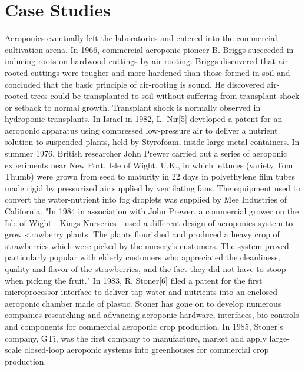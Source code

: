 \documentclass{article}
\begin{document}
\section{Case Studies}
Aeroponics eventually left the laboratories and entered into the commercial cultivation arena. In 1966, commercial aeroponic pioneer B. Briggs succeeded in inducing roots on hardwood cuttings by air-rooting. Briggs discovered that air-rooted cuttings were tougher and more hardened than those formed in soil and concluded that the basic principle of air-rooting is sound. He discovered air-rooted trees could be transplanted to soil without suffering from transplant shock or setback to normal growth. Transplant shock is normally observed in hydroponic transplants. 
In Israel in 1982, L. Nir[5] developed a patent for an aeroponic apparatus using compressed low-pressure air to deliver a nutrient solution to suspended plants, held by Styrofoam, inside large metal containers. 
In summer 1976, British researcher John Prewer carried out a series of aeroponic experiments near New Port, Isle of Wight, U.K., in which lettuces (variety Tom Thumb) were grown from seed to maturity in 22 days in polyethylene film tubes made rigid by pressurized air supplied by ventilating fans. The equipment used to convert the water-nutrient into fog droplets was supplied by Mee Industries of California. "In 1984 in association with John Prewer, a commercial grower on the Isle of Wight - Kings Nurseries - used a different design of aeroponics system to grow strawberry plants. The plants flourished and produced a heavy crop of strawberries which were picked by the nursery's customers. The system proved particularly popular with elderly customers who appreciated the cleanliness, quality and flavor of the strawberries, and the fact they did not have to stoop when picking the fruit."
In 1983, R. Stoner[6] filed a patent for the first microprocessor interface to deliver tap water and nutrients into an enclosed aeroponic chamber made of plastic. Stoner has gone on to develop numerous companies researching and advancing aeroponic hardware, interfaces, bio controls and components for commercial aeroponic crop production. 
In 1985, Stoner's company, GTi, was the first company to manufacture, market and apply large-scale closed-loop aeroponic systems into greenhouses for commercial crop production. 
\end{document}
